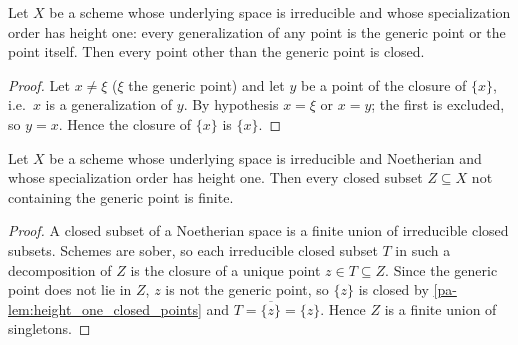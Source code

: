 \begin{lemma}
  \label{pa-lem:height_one_closed_points}
  \leanok

  Let \(X\) be a scheme whose underlying space is irreducible and whose specialization
  order has height one: every generalization of any point is the generic point or the
  point itself. Then every point other than the generic point is closed.
\end{lemma}
\begin{proof}
  \leanok
  Let \(x \neq \xi\) (\(\xi\) the generic point) and let \(y\) be a point of the closure of
  \(\{x\}\), i.e.\ \(x\) is a generalization of \(y\). By hypothesis \(x = \xi\) or
  \(x = y\); the first is excluded, so \(y = x\). Hence the closure of \(\{x\}\) is
  \(\{x\}\).
\end{proof}

\begin{theorem}
  \label{pa-thm:height_one_finite_closed}
  \leanok

  Let \(X\) be a scheme whose underlying space is irreducible and Noetherian and whose
  specialization order has height one. Then every closed subset \(Z \subseteq X\) not
  containing the generic point is finite.
\end{theorem}
\begin{proof}
  \leanok
  A closed subset of a Noetherian space is a finite union of irreducible closed subsets.
  Schemes are sober, so each irreducible closed subset \(T\) in such a decomposition of
  \(Z\) is the closure of a unique point \(z \in T \subseteq Z\). Since the generic point
  does not lie in \(Z\), \(z\) is not the generic point, so \(\{z\}\) is closed by
  \ref{pa-lem:height_one_closed_points} and \(T = \overline{\{z\}} = \{z\}\). Hence \(Z\) is a
  finite union of singletons.
\end{proof}

